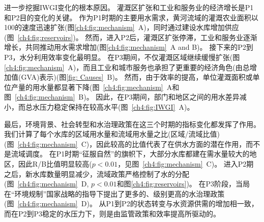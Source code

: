 进一步挖掘IWGI变化的根本原因。
灌溉区扩张和工业和服务业的经济增长是P1和P2目的变化的关键。
作为P1时期的主要用水需求，黄河流域的灌溉农业面积以100的速度迅速扩张(图\ref{ch4:fig:mechanism}~A)，同时通过建设水库增加供应(图~\ref{ch4:fig:reservoirs})。
然而，进入P2后，灌溉区扩张停滞，工业和服务业逐渐增长，共同推动用水需求增加(图\ref{ch4:fig:mechanism}~A and B)。
接下来的P2到P3，水分利用效率变化最明显。
在P3期间，不仅灌溉区域继续缓慢扩张(图\ref{ch4:fig:mechanism}~A)，而且工业和城市服务也承担了更重要的经济角色(由总增加值(GVA)表示)(图\ref{fig: Causes}~B)。
然而，由于效率的提高，单位灌溉面积或单位产量的用水量都显著下降(图~\ref{ch4:fig:mechanism}~A和图~\ref{ch4:fig:mechanism}~B)。
因此，在P3期间，部门和地区之间的用水差异减小，而总水压力稳定保持在较高水平(图~\ref{ch4:fig:IWGI}~A)。

最后，环境背景、社会转型和水治理政策在这三个时期的指标变化都发挥了作用。
我们计算了每个水库的区域用水量和流域用水量之比(区域/流域比值)(图~\ref{ch4:fig:mechanism}~C)，因此较高的比值代表了在供水方面的潜在作用，而不是流域调度。
在P1时期“征服自然”的旗帜下，大部分水库都建在需水量较大的地区，因此R/B比值明显较高($p<0.01$，见图~\ref{ch4:fig:mechanism}~C)。
进入P2期之后，新水库数量明显减少，流域政策严格控制了水的分配(图~\ref{ch4:fig:mechanism}~D, $p<0.01$和图\ref{ch4:fig:reservoirs})。
在P3阶段，当局在“环境规制”国家战略的指导下提出了更多的、级别更高的水治理政策(图~\ref{ch4:fig:mechanism}~D)。
从P1到P2的状态转变与水资源供需的增加相一致，而在P2到P3稳定的水压力下，则是由监管政策和效率提高所驱动的。